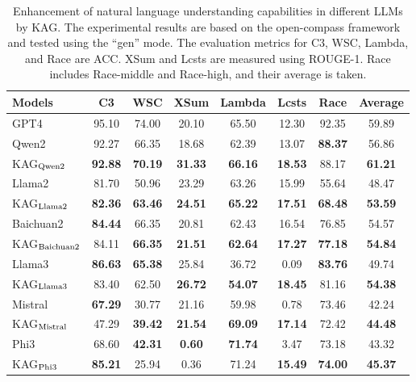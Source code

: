 \documentclass{article}
\begin{document}
\renewcommand\arraystretch{1.1}
\begin{table}[htbp]
\centering
\small
\setlength\aboverulesep{0pt}\setlength\belowrulesep{0pt}
\begin{tabular*}{\textwidth}{@{\extracolsep{\fill}} l|ccccccc}
\toprule
     Models & C3  & WSC & XSum  & Lambda  & Lcsts    & Race  & Average   \\ 
     \midrule
GPT4                  & 95.10          & 74.00          & 20.10          & 65.50          & 12.30          & 92.35        & 59.89  \\
\midrule
Qwen2                 & 92.27          & 66.35          & 18.68          & 62.39          & 13.07          & \textbf{88.37}    & 56.86      \\
KAG$_{\rm Qwen2}$     & \textbf{92.88} & \textbf{70.19} & \textbf{31.33} & \textbf{66.16} & \textbf{18.53} & 88.17    & \textbf{61.21}  \\ 
\midrule
Llama2                & 81.70           & 50.96          & 23.29          & 63.26          & 15.99          & 55.64         &48.47  \\ 
KAG$_{\rm Llama2}$    & \textbf{82.36} & \textbf{63.46} & \textbf{24.51} & \textbf{65.22} & \textbf{17.51} & \textbf{68.48}  &\textbf{53.59} \\
\midrule
Baichuan2             & \textbf{84.44} & 66.35          & 20.81          & 62.43          & 16.54          & 76.85        &54.57  \\ 
KAG$_{\rm Baichuan2}$ & 84.11          & \textbf{66.35} & \textbf{21.51} & \textbf{62.64} & \textbf{17.27} & \textbf{77.18}   & \textbf{54.84} \\
\midrule
Llama3                & \textbf{86.63} & \textbf{65.38} & 25.84          & 36.72          & 0.09           & \textbf{83.76}  & 49.74 \\ 
KAG$_{\rm Llama3}$    & 83.40          & 62.50          & \textbf{26.72} & \textbf{54.07} & \textbf{18.45} & 81.16     & \textbf{54.38}      \\
\midrule
Mistral               & \textbf{67.29} & 30.77          & 21.16          & 59.98          & 0.78      & 73.46    & 42.24      \\ 
KAG$_{\rm Mistral}$   & 47.29          & \textbf{39.42} & \textbf{21.54} & \textbf{69.09} & \textbf{17.14} & 72.42       & \textbf{44.48}   \\ 
\midrule
Phi3                  & 68.60          & \textbf{42.31} & \textbf{0.60}  & \textbf{71.74} & 3.47           & 73.18     & 43.32     \\ 
KAG$_{\rm Phi3}$      & \textbf{85.21} & 25.94          & 0.36           & 71.24          & \textbf{15.49} & \textbf{74.00}     & \textbf{45.37} \\  
 \bottomrule
 \end{tabular*}
\caption{Enhancement of natural language understanding capabilities in different LLMs by KAG. The experimental results are based on the open-compass framework and tested using  the ``gen'' mode. The evaluation metrics for C3, WSC, Lambda, and Race are ACC. XSum and Lcsts are measured using ROUGE-1. Race includes Race-middle and Race-high, and their average is taken.} 
\label{Tab.llm_nlu} 
\end{table}
\end{document}

